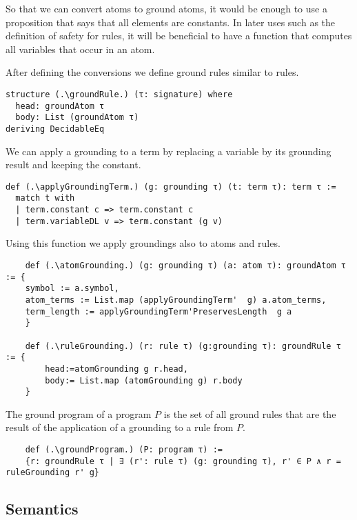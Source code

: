 So that we can convert atoms to ground atoms, it would be enough to use a proposition that says that all elements are constants. In later uses such as the definition of safety for rules, it will be beneficial to have a function that computes all variables that occur in an atom. 



After defining the conversions we define ground rules similar to rules.

\begin{lstlisting}
structure (.\groundRule.) (τ: signature) where
  head: groundAtom τ
  body: List (groundAtom τ)
deriving DecidableEq
\end{lstlisting}

We can apply a grounding to a term by replacing a variable by its grounding result and keeping the constant.
\begin{lstlisting}
def (.\applyGroundingTerm.) (g: grounding τ) (t: term τ): term τ :=
  match t with
  | term.constant c => term.constant c
  | term.variableDL v => term.constant (g v)
\end{lstlisting}

Using this function we apply groundings also to atoms and rules. 

\begin{lstlisting}
    def (.\atomGrounding.) (g: grounding τ) (a: atom τ): groundAtom τ := {
    symbol := a.symbol, 
    atom_terms := List.map (applyGroundingTerm'  g) a.atom_terms, 
    term_length := applyGroundingTerm'PreservesLength  g a
    }

    def (.\ruleGrounding.) (r: rule τ) (g:grounding τ): groundRule τ := {
        head:=atomGrounding g r.head, 
        body:= List.map (atomGrounding g) r.body 
    }

\end{lstlisting}

The ground program of a program $P$ is the set of all ground rules that are the result of the application of a grounding to a rule from $P$.

\begin{lstlisting}
    def (.\groundProgram.) (P: program τ) := 
    {r: groundRule τ | ∃ (r': rule τ) (g: grounding τ), r' ∈ P ∧ r = ruleGrounding r' g}
\end{lstlisting}

\subsection{Semantics}

